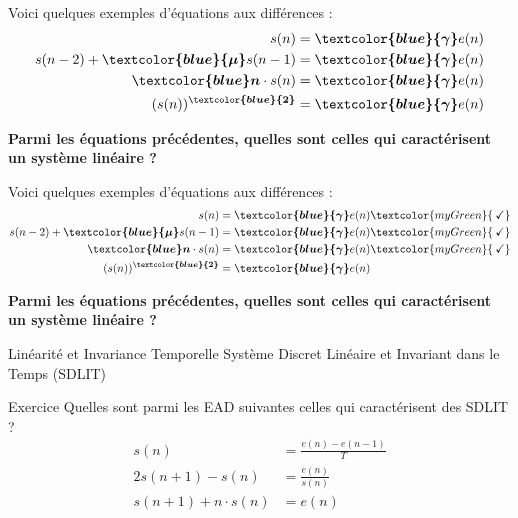 \documentclass[a4paper,11pt]{beamer}
\newcounter{exampleBlockCounter}
\begin{document}
\begin{frame}
\justifying
Voici quelques exemples d'équations aux différences :
\setcounter{equation}{0}
\begin{align}
  s(n) &= \bm{\textcolor{blue}{\gamma}} e(n)\\
  s(n-2) + \bm{\textcolor{blue}{\mu}} s(n-1) &= \bm{\textcolor{blue}{\gamma}}
  e(n)\\
  \bm{\textcolor{blue}n} \cdot s(n) &= \bm{\textcolor{blue}{\gamma}} e(n)\\
  (s(n))^{\bm{\textcolor{blue}{2}}} &= \bm{\textcolor{blue}{\gamma}} e(n)
\end{align}
\centering

\textcolor{myGreen}{\textbf{Parmi les équations précédentes, quelles sont celles
qui caractérisent un système linéaire ?}}
\end{frame}

\begin{frame}
\justifying
Voici quelques exemples d'équations aux différences :
\setcounter{equation}{0}
\begin{align}
  s(n) &= \bm{\textcolor{blue}{\gamma}} e(n)\textcolor{myGreen}{\:\checkmark}\\
  s(n-2) + \bm{\textcolor{blue}{\mu}} s(n-1) &= \bm{\textcolor{blue}{\gamma}}
  e(n)\textcolor{myGreen}{\:\checkmark}\\
  \bm{\textcolor{blue}n} \cdot s(n) &= \bm{\textcolor{blue}{\gamma}}
  e(n)\textcolor{myGreen}{\:\checkmark}\\
  (s(n))^{\bm{\textcolor{blue}{2}}} &= \bm{\textcolor{blue}{\gamma}} e(n)
\end{align}
\centering

\textcolor{myGreen}{\textbf{Parmi les équations précédentes, quelles sont celles
qui caractérisent un système linéaire ?}}
\end{frame}

\begin{frame}
\begin{alertblock}{Linéarité et Invariance Temporelle}
\center
Système Discret Linéaire et Invariant dans le Temps (SDLIT) 
\end{alertblock}
\begin{exampleblock}{Exercice }
\justifying
Quelles sont parmi les EAD suivantes celles qui caractérisent des SDLIT ?
\setcounter{equation}{0}
\begin{align}
  s(n) &= \frac{e(n)-e(n-1)}{T}\\
  2s(n+1) - s(n)  &= \frac{e(n)}{s(n)}\\
  s(n+1) + n\cdot s(n) &= e(n)
\end{align}
\end{exampleblock}
\end{frame}
\end{document}
